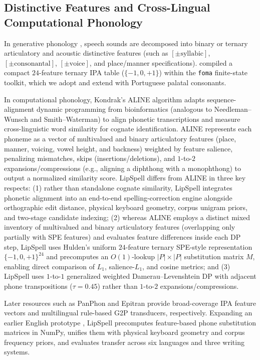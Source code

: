 \documentclass[11pt,a4paper]{article}
\begin{document}
\subsection{Distinctive Features and Cross-Lingual Computational Phonology}
In generative phonology \citep{chomsky1968sound}, speech sounds are decomposed into binary or ternary articulatory and acoustic distinctive features (such as $[\pm\text{syllabic}]$, $[\pm\text{consonantal}]$, $[\pm\text{voice}]$, and place/manner specifications). \citet{hulden2012distinctive} compiled a compact $24$-feature ternary IPA table ($\{-1, 0, +1\}$) within the \texttt{foma} finite-state toolkit, which we adopt and extend with Portuguese palatal consonants.

In computational phonology, Kondrak's ALINE algorithm \citep{kondrak2003phonetic} adapts sequence-alignment dynamic programming from bioinformatics (analogous to Needleman--Wunsch and Smith--Waterman) to align phonetic transcriptions and measure cross-linguistic word similarity for cognate identification. ALINE represents each phoneme as a vector of multivalued and binary articulatory features (place, manner, voicing, vowel height, and backness) weighted by feature salience, penalizing mismatches, skips (insertions/deletions), and $1$-to-$2$ expansions/compressions (e.g., aligning a diphthong with a monophthong) to output a normalized similarity score. LipSpell differs from ALINE in three key respects: (1) rather than standalone cognate similarity, LipSpell integrates phonetic alignment into an end-to-end spelling-correction engine alongside orthographic edit distance, physical keyboard geometry, corpus unigram priors, and two-stage candidate indexing; (2) whereas ALINE employs a distinct mixed inventory of multivalued and binary articulatory features (overlapping only partially with SPE features) and evaluates feature differences inside each DP step, LipSpell uses Hulden's uniform $24$-feature ternary SPE-style representation $\{-1,0,+1\}^{24}$ and precomputes an $O(1)$-lookup $|P|\times|P|$ substitution matrix $M$, enabling direct comparison of $L_1$, salience-$L_1$, and cosine metrics; and (3) LipSpell uses $1$-to-$1$ generalized weighted Damerau--Levenshtein DP with adjacent phone transpositions ($\tau=0.45$) rather than $1$-to-$2$ expansions/compressions.

Later resources such as PanPhon \citep{mortensen2016panphon} and Epitran \citep{mortensen2018epitran} provide broad-coverage IPA feature vectors and multilingual rule-based G2P transducers, respectively. Expanding an earlier English prototype \citep{araujo2018phonetic}, LipSpell precomputes feature-based phone substitution matrices in NumPy, unifies them with physical keyboard geometry and corpus frequency priors, and evaluates transfer across six languages and three writing systems.
\end{document}
